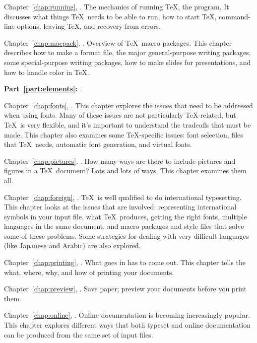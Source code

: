 Chapter~\ref{chap:running}, {\it {}}.  The mechanics of
running \TeX, the program.  It discusses what things \TeX\ needs to be able to
run, how to start \TeX, command-line options, leaving \TeX, and recovery from
errors.

Chapter~\ref{chap:macpack}, {\it {}}.  Overview of \TeX\
macro packages.  This chapter describes how to make a format file, the major
general-purpose writing packages, some special-purpose writing packages,
how to make slides for presentations, and how to handle color in \TeX.

\textbf{Part~\ref{part:elements}: {\it {}}}.

Chapter~\ref{chap:fonts}, {\it {}}.  This chapter explores
the issues that need to be addressed when using fonts.  Many of these issues
are not particularly \TeX-related, but \TeX\ is very flexible, and it's
important to understand the tradeoffs that must be made.  This chapter also
examines some \TeX-specific issues: font selection, files that \TeX\ needs,
automatic font generation, and virtual fonts.

Chapter~\ref{chap:pictures}, {\it {}}.  How many ways are
there to include pictures and figures in a \TeX\ document?  Lots and lots of
ways.  This chapter examines them all.

Chapter~\ref{chap:foreign}, {\it {}}.  \TeX\ is well
qualified to do international typesetting.  This chapter looks at the issues
that are involved: representing international symbols in your input file, what
\TeX\ produces, getting the right fonts, multiple languages in the same
document, and macro packages and style files that solve some of these
problems.  Some strategies for dealing with very difficult languages (like
Japanese and Arabic) are also explored.

Chapter~\ref{chap:printing}, {\it {}}.  What goes in has
to come out.  This chapter tells the what, where, why, and how of printing
your documents.

Chapter~\ref{chap:preview}, {\it {}}.  Save paper; preview
your documents before you print them.

Chapter~\ref{chap:online}, {\it {}}.  Online documentation
is becoming increasingly popular.  This chapter explores different ways that both
typeset and online documentation can be produced from the same set
of input files.

